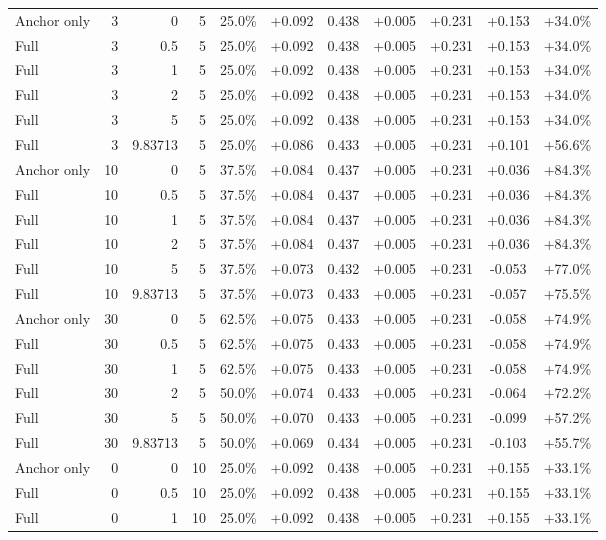 \begin{table}[htbp]
\begin{tabular}{lrrrccccccc}
Anchor only & 3 & 0 & 5 & 25.0\% & +0.092 & 0.438 & +0.005 & +0.231 & +0.153 & +34.0\% \\
Full & 3 & 0.5 & 5 & 25.0\% & +0.092 & 0.438 & +0.005 & +0.231 & +0.153 & +34.0\% \\
Full & 3 & 1 & 5 & 25.0\% & +0.092 & 0.438 & +0.005 & +0.231 & +0.153 & +34.0\% \\
Full & 3 & 2 & 5 & 25.0\% & +0.092 & 0.438 & +0.005 & +0.231 & +0.153 & +34.0\% \\
Full & 3 & 5 & 5 & 25.0\% & +0.092 & 0.438 & +0.005 & +0.231 & +0.153 & +34.0\% \\
Full & 3 & 9.83713 & 5 & 25.0\% & +0.086 & 0.433 & +0.005 & +0.231 & +0.101 & +56.6\% \\
Anchor only & 10 & 0 & 5 & 37.5\% & +0.084 & 0.437 & +0.005 & +0.231 & +0.036 & +84.3\% \\
Full & 10 & 0.5 & 5 & 37.5\% & +0.084 & 0.437 & +0.005 & +0.231 & +0.036 & +84.3\% \\
Full & 10 & 1 & 5 & 37.5\% & +0.084 & 0.437 & +0.005 & +0.231 & +0.036 & +84.3\% \\
Full & 10 & 2 & 5 & 37.5\% & +0.084 & 0.437 & +0.005 & +0.231 & +0.036 & +84.3\% \\
Full & 10 & 5 & 5 & 37.5\% & +0.073 & 0.432 & +0.005 & +0.231 & -0.053 & +77.0\% \\
Full & 10 & 9.83713 & 5 & 37.5\% & +0.073 & 0.433 & +0.005 & +0.231 & -0.057 & +75.5\% \\
Anchor only & 30 & 0 & 5 & 62.5\% & +0.075 & 0.433 & +0.005 & +0.231 & -0.058 & +74.9\% \\
Full & 30 & 0.5 & 5 & 62.5\% & +0.075 & 0.433 & +0.005 & +0.231 & -0.058 & +74.9\% \\
Full & 30 & 1 & 5 & 62.5\% & +0.075 & 0.433 & +0.005 & +0.231 & -0.058 & +74.9\% \\
Full & 30 & 2 & 5 & 50.0\% & +0.074 & 0.433 & +0.005 & +0.231 & -0.064 & +72.2\% \\
Full & 30 & 5 & 5 & 50.0\% & +0.070 & 0.433 & +0.005 & +0.231 & -0.099 & +57.2\% \\
Full & 30 & 9.83713 & 5 & 50.0\% & +0.069 & 0.434 & +0.005 & +0.231 & -0.103 & +55.7\% \\
Anchor only & 0 & 0 & 10 & 25.0\% & +0.092 & 0.438 & +0.005 & +0.231 & +0.155 & +33.1\% \\
Full & 0 & 0.5 & 10 & 25.0\% & +0.092 & 0.438 & +0.005 & +0.231 & +0.155 & +33.1\% \\
Full & 0 & 1 & 10 & 25.0\% & +0.092 & 0.438 & +0.005 & +0.231 & +0.155 & +33.1\% \\

\end{tabular}
\end{table}

